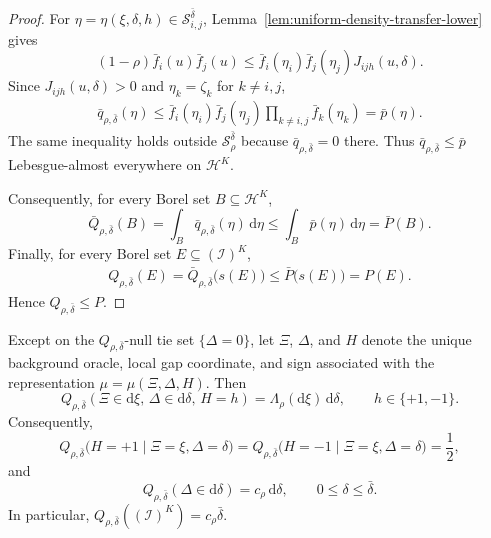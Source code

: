\documentclass[10pt]{article}
\newcommand{\dd}{\mathrm{d}}
\theoremstyle{plain}
\begin{document}
\begin{proof}
For
$\eta=\eta(\xi,\delta,h)\in\mathcal S_{i,j}^{\bar\delta}$,
Lemma~\ref{lem:uniform-density-transfer-lower} gives
\[
    (1-\rho)\bar f_i(u)\bar f_j(u)
    \le
    \bar f_i(\eta_i)\bar f_j(\eta_j)
    J_{ijh}(u,\delta).
\]
Since $J_{ijh}(u,\delta)>0$ and $\eta_k=\zeta_k$ for $k\neq i,j$,
\[
\begin{aligned}
    \bar q_{\rho,\bar\delta}(\eta)
    \le
    \bar f_i(\eta_i)\bar f_j(\eta_j)
    \prod_{k\neq i,j}\bar f_k(\eta_k)
    =
    \bar p(\eta).
\end{aligned}
\]
The same inequality holds outside $\mathcal S_\rho^{\bar\delta}$ because
$\bar q_{\rho,\bar\delta}=0$ there. Thus
$\bar q_{\rho,\bar\delta}\le\bar p$ Lebesgue-almost everywhere on
$\mathcal H^K$.

Consequently, for every Borel set $B\subseteq\mathcal H^K$,
\[
    \bar Q_{\rho,\bar\delta}(B)
    =
    \int_B\bar q_{\rho,\bar\delta}(\eta)\,\dd\eta
    \le
    \int_B\bar p(\eta)\,\dd\eta
    =
    \bar P(B).
\]
Finally, for every Borel set
$E\subseteq(\mathcal I)^K$,
\[
\begin{aligned}
    Q_{\rho,\bar\delta}(E)
    =
    \bar Q_{\rho,\bar\delta}\bigl(s(E)\bigr)
    \le
    \bar P\bigl(s(E)\bigr)
    =
    P(E).
\end{aligned}
\]
Hence $Q_{\rho,\bar\delta}\le P$. 
\end{proof}

\begin{lemma}
\label{lem:q-rho-properties-transfer-lower}
Except on the $Q_{\rho,\bar\delta}$-null tie set $\{\Delta=0\}$, let
$\Xi$, $\Delta$, and $H$ denote the unique background oracle, local gap coordinate, and sign associated with the representation
$\mu=\mu(\Xi,\Delta,H)$. Then
\begin{equation}
\label{eq:Q-coordinate-factorization-transfer-lower}
    Q_{\rho,\bar\delta}
    \left(
        \Xi\in\dd\xi,\,
        \Delta\in\dd\delta,\,
        H=h
    \right)
    =
    \Lambda_\rho(\dd\xi)\,\dd\delta,
    \qquad
    h\in\{+1,-1\}.
\end{equation}
Consequently,
\[
    Q_{\rho,\bar\delta}
    \bigl(
        H=+1
        \mid
        \Xi=\xi,\Delta=\delta
    \bigr)
    =
    Q_{\rho,\bar\delta}
    \bigl(
        H=-1
        \mid
        \Xi=\xi,\Delta=\delta
    \bigr)
    =
    \frac12,
\]
and
\[
    Q_{\rho,\bar\delta}(\Delta\in\dd\delta)
    =
    c_\rho\,\dd\delta,
    \qquad
    0\le\delta\le\bar\delta.
\]
In particular,
$Q_{\rho,\bar\delta}((\mathcal I)^K)=c_\rho\bar\delta$.
\end{lemma}
\end{document}
